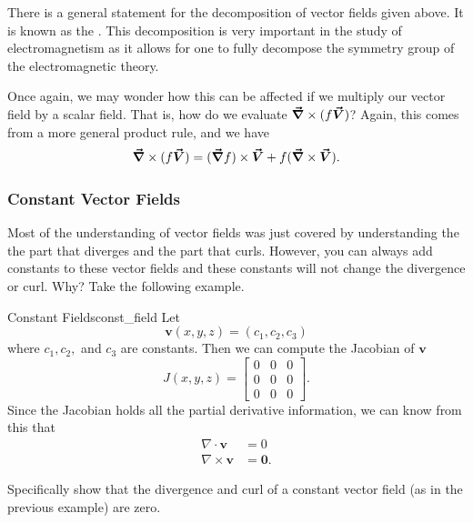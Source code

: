 		        \begin{remark}
		        	There is a general statement for the decomposition of vector fields given above.  It is known as the .  This decomposition is very important in the study of electromagnetism as it allows for one to fully decompose the symmetry group of the electromagnetic theory.
		        			        \end{remark}

		       Once again, we may wonder how this can be affected if we multiply our vector field by a scalar field.  That is, how do we evaluate $\boldsymbol{\vec{\nabla}} \times (f\boldsymbol{\vec{V}})$?  Again, this comes from a more general product rule, and we have
		       \[
		       \boldsymbol{\vec{\nabla}} \times (f \boldsymbol{\vec{V}}) = (\boldsymbol{\vec{\nabla}} f)\times \boldsymbol{\vec{V}} + f (\boldsymbol{\vec{\nabla}} \times \boldsymbol{\vec{V}}).
		       \]

		        \subsubsection{Constant Vector Fields}
		        Most of the understanding of vector fields was just covered by understanding the the part that diverges and the part that curls.  However, you can always add constants to these vector fields and these constants will not change the divergence or curl. Why? Take the following example.

		        \begin{ex}{Constant Fields}{const_field}
		        Let
		        \[
		        \mathbf{v}(x,y,z) = (c_1,c_2,c_3)
		        \]
		        where $c_1,c_2,$ and $c_3$ are constants.  Then we can compute the Jacobian of $\mathbf{v}$
		        \[
		        J(x,y,z) = \begin{bmatrix} 0 & 0 & 0 \\ 0 & 0 & 0\\ 0 & 0 &0 \end{bmatrix}.
		        \]
		        Since the Jacobian holds all the partial derivative information, we can know from this that
		        \begin{align*}
		            \nabla \cdot \mathbf{v} &= 0\\
		            \nabla \times \mathbf{v} &= \mathbf{0}.
		        \end{align*}
		        \end{ex}

		        \begin{exercise}
		        Specifically show that the divergence and curl of a constant vector field (as in the previous example) are zero.
		        \end{exercise}

